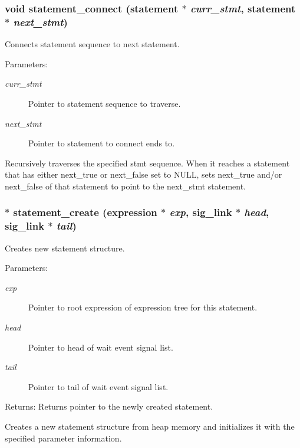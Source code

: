 \subsubsection{\setlength{\rightskip}{0pt plus 5cm}void statement\_\-connect ({\bf statement} $\ast$ {\em curr\_\-stmt}, {\bf statement} $\ast$ {\em next\_\-stmt})}\label{statement_8c_a7}


Connects statement sequence to next statement. 

\begin{Desc}
\item[Parameters:]
\begin{description}
\item[{\em curr\_\-stmt}]Pointer to statement sequence to traverse. \item[{\em next\_\-stmt}]Pointer to statement to connect ends to.\end{description}
\end{Desc}
Recursively traverses the specified stmt sequence. When it reaches a statement that has either next\_\-true or next\_\-false set to NULL, sets next\_\-true and/or next\_\-false of that statement to point to the next\_\-stmt statement. 
\subsubsection{$\ast$ statement\_\-create ({\bf expression} $\ast$ {\em exp}, {\bf sig\_\-link} $\ast$ {\em head}, {\bf sig\_\-link} $\ast$ {\em tail})}\label{statement_8c_a2}


Creates new statement structure. 

\begin{Desc}
\item[Parameters:]
\begin{description}
\item[{\em exp}]Pointer to root expression of expression tree for this statement. \item[{\em head}]Pointer to head of wait event signal list. \item[{\em tail}]Pointer to tail of wait event signal list.\end{description}
\end{Desc}
\begin{Desc}
\item[Returns:]Returns pointer to the newly created statement.\end{Desc}
Creates a new statement structure from heap memory and initializes it with the specified parameter information. 

